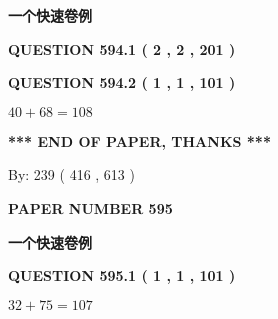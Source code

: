 \documentclass{ctexart}
\begin{document}
   
   
   
 \vspace{0.2in}
{\LARGE {\textbf{ 一个快速卷例}}}
   
   
  
\vspace{0.2in}
  
{\textbf{\Large{QUESTION
594.1 
 ( 2 , 2 , 201 )
}}}
  
  
  
\vspace{0.2in}
  
{\textbf{\Large{QUESTION
594.2 
 ( 1 , 1 , 101 )
}}}
  
  
 
 

$ %
40 +  %
68=   %
108$
 
 
   
   
 \vspace{0.2in}
 
   
   
   
   
\vspace{1.0in} 
{\textbf{\large{ *** END OF PAPER, THANKS *** }}} 
   
   
\hspace{1.0in} By: 
 239 ( 416 ,  613 )
   
   
   
   
\newpage 
\setcounter{page}{ 
   595001 } 
   
   
   
   
 {\textbf{ \Large{ PAPER NUMBER  595  }}}
   
   
\vspace{0.2in}
   
   
   
   
   
   
 \vspace{0.2in}
{\LARGE {\textbf{ 一个快速卷例}}}
   
   
  
\vspace{0.2in}
  
{\textbf{\Large{QUESTION
595.1 
 ( 1 , 1 , 101 )
}}}
  
  
 
 

$ %
32 +  %
75=   %
107$
 
 
  
\vspace{0.2in}
  
\end{document}
